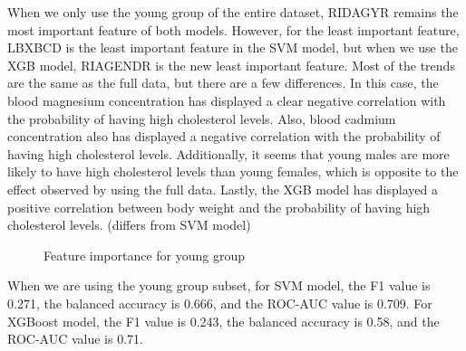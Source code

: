 \documentclass{article}
\begin{document}
When we only use the young group of the entire dataset, RIDAGYR remains the most important feature of both models. However, for the least important feature, LBXBCD is the least important feature in the SVM model, but when we use the XGB model, RIAGENDR is the new least important feature. Most of the trends are the same as the full data, but there are a few differences. In this case, the blood magnesium concentration has displayed a clear negative correlation with the probability of having high cholesterol levels. Also, blood cadmium concentration also has displayed a negative correlation with the probability of having high cholesterol levels. Additionally, it seems that young males are more likely to have high cholesterol levels than young females, which is opposite to the effect observed by using the full data. Lastly, the XGB model has displayed a positive correlation between body weight and the probability of having high cholesterol levels. (differs from SVM model)

\begin{figure}[!ht]
    \centering
    \qquad
    \caption{Feature importance for young group}
\end{figure}

When we are using the young group subset, for SVM model, the F1 value is 0.271, the balanced accuracy is 0.666, and the ROC-AUC value is 0.709. For XGBoost model, the F1 value is 0.243, the balanced accuracy is 0.58, and the ROC-AUC value is 0.71.
\end{document}
